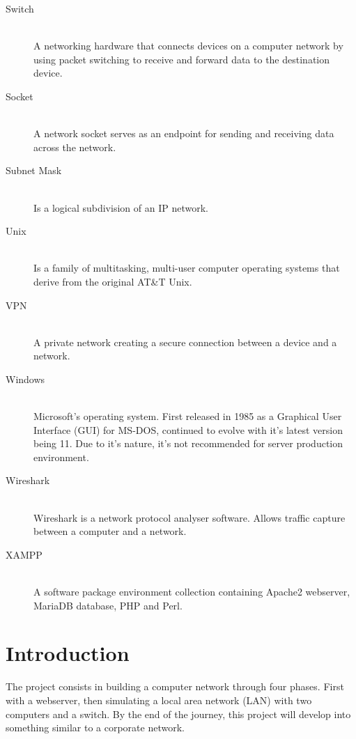 \documentclass[11pt,a4paper]{report}
\begin{document}
\begin{description}
        \item[Switch] \hfill \\
            A networking hardware that connects devices on a computer network by using packet switching to receive and forward data to the destination device.
        \item[Socket] \hfill \\
            A network socket serves as an endpoint for sending and receiving data across the network.
        \item[Subnet Mask] \hfill \\
            Is a logical subdivision of an IP network.
        \item[Unix] \hfill \\
            Is a family of multitasking, multi-user computer operating systems that derive from the original AT\&T Unix.
        \item[VPN] \hfill \\
            A private network creating a secure connection between a device and a network.
        \item[Windows] \hfill \\
            Microsoft's operating system. First released in 1985 as a Graphical User Interface (GUI) for MS-DOS, continued to evolve with it's latest version being 11.
            Due to it's nature, it's not recommended for server production environment.
        \item[Wireshark] \hfill \\
            Wireshark is a network protocol analyser software. Allows traffic capture between a computer and a network.
        \item[XAMPP] \hfill \\
            A software package environment collection containing Apache2 webserver, MariaDB database, PHP and Perl.
    \end{description}

\chapter{Introduction}
    \pagestyle{fancy}
    The project consists in building a computer network through four phases. First with a webserver, then simulating a local area network (LAN) with two computers and a switch.
    By the end of the journey, this project will develop into something similar to a corporate network.
\end{document}
